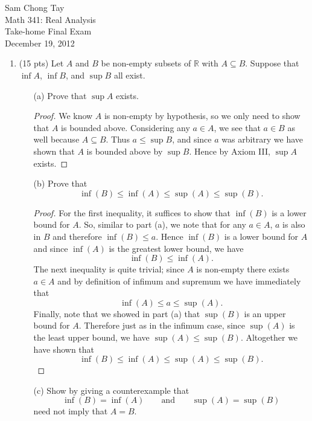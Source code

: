 \documentclass[12pt,twoside]{article}
\newcommand{\R}{\mathbb R} %
\begin{document}
\begin{center}
Sam Chong Tay\\
Math 341: Real Analysis\\
Take-home Final Exam\\
December 19, 2012\\
\end{center}

\begin{enumerate}
\item (15 pts) Let $A$ and $B$  be non-empty subsets of $\R$ with $A\subseteq B$.  Suppose that $\inf A$, $\inf B$, and $\sup B$ all exist.

\begin{itemize}
\item[(a)] Prove that $\sup A$ exists.

\begin{proof} We know $A$ is non-empty by hypothesis, so we only need to show that $A$ is bounded above. Considering any $a\in A$, we see that $a\in B$ as well because $A\subseteq B$. Thus $a \le \sup B$, and since $a$ was arbitrary we have shown that $A$ is bounded above by $\sup B$. Hence by Axiom III, $\sup A$ exists.
\end{proof}

\item[(b)] Prove that $$ \inf(B)\leq\inf(A)\leq\sup(A)\leq\sup(B). $$

\begin{proof} For the first inequality, it suffices to show that $\inf(B)$ is a lower bound for $A$. So, similar to part (a), we note that for any $a\in A$, $a$ is also in $B$ and therefore $\inf(B) \le a$. Hence $\inf(B)$ is a lower bound for $A$ and since $\inf(A)$ is the greatest lower bound, we have $$\inf(B) \le \inf(A).$$ The next inequality is quite trivial; since $A$ is non-empty there exists $a\in A$ and by definition of infimum and supremum we have immediately that $$\inf(A)\le a \le \sup(A).$$ Finally, note that we showed in part (a) that $\sup(B)$ is an upper bound for $A$. Therefore just as in the infimum case, since $\sup(A)$ is the least upper bound, we have $\sup(A)\le\sup(B)$. Altogether we have shown that $$ \inf(B)\leq\inf(A)\leq\sup(A)\leq\sup(B).$$\end{proof}

\item[(c)] Show by giving a counterexample that $$\inf(B)=\inf(A)\qquad\textrm{and}\qquad \sup(A)=\sup(B)$$ need not imply that $A=B$.\\


\end{itemize}
\end{enumerate}
\end{document}
